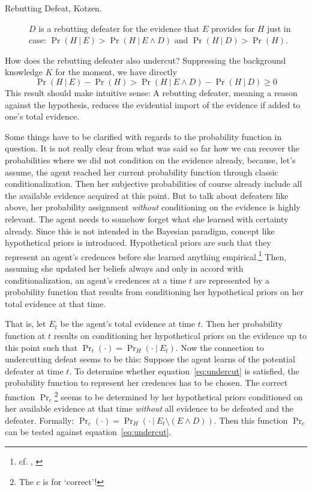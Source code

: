 \documentclass[11pt, a4paper]{scrartcl}
\newcommand{\given}[1][]{\:#1\vert\:}
\renewcommand{\i}[1]{\emph{#1}}
\begin{document}
\begin{description}
    \item[Rebutting Defeat, Kotzen.] $D$ is a rebutting defeater for the evidence that $E$ provides for $H$ just in case: $\Pr(H \given E) > \Pr(H \given E \land D)$ and $\Pr(H \given D) > \Pr(H)$.
\end{description}

How does the rebutting defeater also undercut? Suppressing the background knowledge $K$ for the moment, we have directly 
\[{ \Pr(H \given E) - \Pr(H)  >  \Pr(H \given E \land D) - \Pr(H\given D) \geqslant 0 }\]
This result should make intuitive sense: A rebutting defeater, meaning a reason against the hypothesis, reduces the evidential import of the evidence if added to one's total evidence.     

Some things have to be clarified with regards to the probability function in question. It is not really clear from what was said so far how we can recover the probabilities where we did not condition on the evidence already, because, let's assume, the agent reached her current probability function through classic conditionalization. Then her subjective probabilities of course already include all the available evidence acquired at this point. But to talk about defeaters like above, her probability assignment \i{without} conditioning on the evidence is highly relevant. The agent needs to somehow forget what she learned with certainty already. Since this is not intended in the Bayesian paradigm, concept like hypothetical priors is introduced. Hypothetical priors are such that they represent an agent's credences before she learned anything empirical.\footnote{cf. \textcite[Ch. 4]{Levi1980}, \textcite[110]{Titelbaum2017}} Then, assuming she updated her beliefs always and only in accord with conditionalization, an agent's credences at a time $t$ are represented by a probability function that results from conditioning her hypothetical priors on her total evidence at that time.

That is, let $E_t$ be the agent's total evidence at time $t$. Then her probability function at $t$ results on conditioning her hypothetical priors on the evidence up to this point such that $\Pr_t(\cdot) = \Pr_H(\cdot \given E_t)$. Now the connection to undercutting defeat seems to be this: Suppose the agent learns of the potential defeater at time $t$. To determine whether equation~\ref{eq:undercut} is satisfied, the probability function to represent her credences has to be chosen. The correct function $\Pr_c$\footnote{The $c$ is for `correct'!} seems to be determined by her hypothetical priors conditioned on her available evidence at that time \i{without} all evidence to be defeated and the defeater. Formally: $ \Pr_c(\cdot) = \Pr_H (\cdot \given E_t \setminus (E \land D))$. Then this function $\Pr_c$ can be tested against equation~\ref{eq:undercut}.
\end{document}

